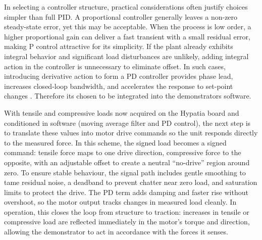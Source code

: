 In selecting a controller structure, practical considerations often justify choices simpler than full PID. A proportional controller generally leaves a non-zero steady-state error, yet this may be acceptable. When the process is low order, a higher proportional gain can deliver a fast transient with a small residual error, making P control attractive for its simplicity. If the plant already exhibits integral behavior and significant load disturbances are unlikely, adding integral action in the controller is unnecessary to eliminate offset. In such cases, introducing derivative action to form a PD controller provides phase lead, increases closed-loop bandwidth, and accelerates the response to set-point changes \cite[see][15]{Visioli:2006}. Therefore its chosen to be integrated into the demonstrators software. 

With tensile and compressive loads now acquired on the Hypatia board and conditioned in software (moving average filter and PD control), the next step is to translate these values into motor drive commands so the unit responds directly to the measured force. In this scheme, the signed load becomes a signed command: tensile force maps to one drive direction, compressive force to the opposite, with an adjustable offset to create a neutral “no-drive” region around zero. To ensure stable behaviour, the signal path includes gentle smoothing to tame residual noise, a deadband to prevent chatter near zero load, and saturation limits to protect the drive. The \ac{PD} term adds damping and faster rise without overshoot, so the motor output tracks changes in measured load cleanly. In operation, this closes the loop from structure to traction: increases in tensile or compressive load are reflected immediately in the motor’s torque and direction, allowing the demonstrator to act in accordance with the forces it senses.
\newpage